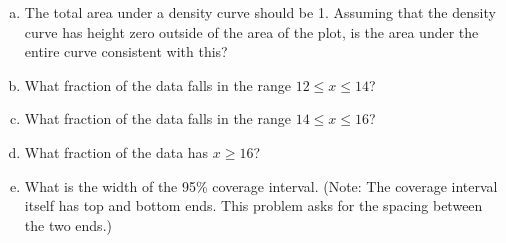 \begin{enumerate}[(a)]
\item The total area under a density curve should be 1.
  Assuming that the density curve has height zero outside of the area
  of the plot, is the area under the entire curve consistent with
  this?

\item What fraction of the data falls in the range $12 \leq x \leq
  14$?

\begin{MultipleChoice}
\end{MultipleChoice}

\item What fraction of the data falls in the range $14 \leq x \leq
  16$?

\begin{MultipleChoice}
\end{MultipleChoice}

\item What fraction of the data has $x \geq 16$?

\begin{MultipleChoice}
\end{MultipleChoice}


\item What is the width of the 95\% coverage interval.  (Note: The
  coverage interval itself has top and bottom ends.  This problem asks
  for the spacing between the two ends.)
\begin{MultipleChoice}
\end{MultipleChoice}

\end{enumerate}

